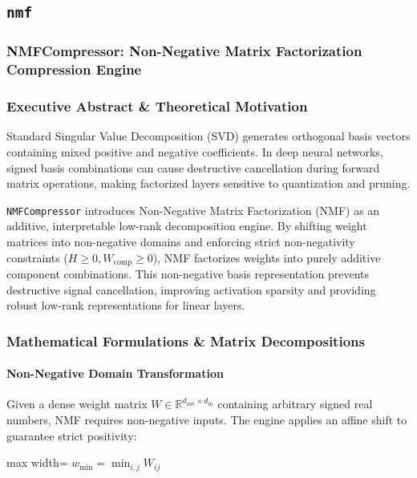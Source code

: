 \subsection{\texttt{nmf}}
\subsubsection*{NMFCompressor: Non-Negative Matrix Factorization Compression Engine}

\subsubsection*{Executive Abstract \& Theoretical Motivation}
Standard Singular Value Decomposition (SVD) generates orthogonal basis vectors containing mixed positive and negative coefficients. In deep neural networks, signed basis combinations can cause destructive cancellation during forward matrix operations, making factorized layers sensitive to quantization and pruning.

\texttt{NMFCompressor} introduces Non-Negative Matrix Factorization (NMF) as an additive, interpretable low-rank decomposition engine. By shifting weight matrices into non-negative domains and enforcing strict non-negativity constraints ($H \ge 0, W_{\text{comp}} \ge 0$), NMF factorizes weights into purely additive component combinations. This non-negative basis representation prevents destructive signal cancellation, improving activation sparsity and providing robust low-rank representations for linear layers.


\subsubsection*{Mathematical Formulations \& Matrix Decompositions}

\paragraph{Non-Negative Domain Transformation}
Given a dense weight matrix $W \in \mathbb{R}^{d_{\text{out}} \times d_{\text{in}}}$ containing arbitrary signed real numbers, NMF requires non-negative inputs. The engine applies an affine shift to guarantee strict positivity:

\begin{center}
\begin{adjustbox}{max width=\columnwidth}
$\displaystyle
w_{\min} = \min_{i,j} W_{ij}
$
\end{adjustbox}
\end{center}

